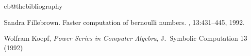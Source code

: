 
\expandafter
\let\expandafter\thebibliography\csname cb@thebibliography\endcsname
{}

\begin{thebibliography}{9}

Sandra Fillebrown.
\newblock Faster computation of bernoulli numbers.
, 13:431--445, 1992.

 Wolfram Koepf,
{\em Power Series in Computer Algebra},
J.\ Symbolic Computation 13 (1992)

\end{thebibliography}




